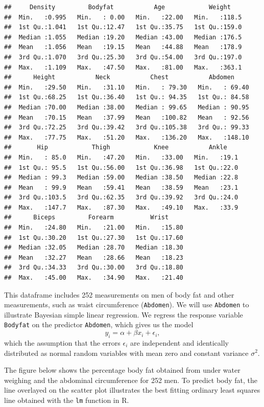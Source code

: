 \documentclass[]{book}
\theoremstyle{definition}
\theoremstyle{definition}
\theoremstyle{definition}
\theoremstyle{remark}
\begin{document}
\begin{verbatim}
##     Density         Bodyfat           Age            Weight     
##  Min.   :0.995   Min.   : 0.00   Min.   :22.00   Min.   :118.5  
##  1st Qu.:1.041   1st Qu.:12.47   1st Qu.:35.75   1st Qu.:159.0  
##  Median :1.055   Median :19.20   Median :43.00   Median :176.5  
##  Mean   :1.056   Mean   :19.15   Mean   :44.88   Mean   :178.9  
##  3rd Qu.:1.070   3rd Qu.:25.30   3rd Qu.:54.00   3rd Qu.:197.0  
##  Max.   :1.109   Max.   :47.50   Max.   :81.00   Max.   :363.1  
##      Height           Neck           Chest           Abdomen      
##  Min.   :29.50   Min.   :31.10   Min.   : 79.30   Min.   : 69.40  
##  1st Qu.:68.25   1st Qu.:36.40   1st Qu.: 94.35   1st Qu.: 84.58  
##  Median :70.00   Median :38.00   Median : 99.65   Median : 90.95  
##  Mean   :70.15   Mean   :37.99   Mean   :100.82   Mean   : 92.56  
##  3rd Qu.:72.25   3rd Qu.:39.42   3rd Qu.:105.38   3rd Qu.: 99.33  
##  Max.   :77.75   Max.   :51.20   Max.   :136.20   Max.   :148.10  
##       Hip            Thigh            Knee           Ankle     
##  Min.   : 85.0   Min.   :47.20   Min.   :33.00   Min.   :19.1  
##  1st Qu.: 95.5   1st Qu.:56.00   1st Qu.:36.98   1st Qu.:22.0  
##  Median : 99.3   Median :59.00   Median :38.50   Median :22.8  
##  Mean   : 99.9   Mean   :59.41   Mean   :38.59   Mean   :23.1  
##  3rd Qu.:103.5   3rd Qu.:62.35   3rd Qu.:39.92   3rd Qu.:24.0  
##  Max.   :147.7   Max.   :87.30   Max.   :49.10   Max.   :33.9  
##      Biceps         Forearm          Wrist      
##  Min.   :24.80   Min.   :21.00   Min.   :15.80  
##  1st Qu.:30.20   1st Qu.:27.30   1st Qu.:17.60  
##  Median :32.05   Median :28.70   Median :18.30  
##  Mean   :32.27   Mean   :28.66   Mean   :18.23  
##  3rd Qu.:34.33   3rd Qu.:30.00   3rd Qu.:18.80  
##  Max.   :45.00   Max.   :34.90   Max.   :21.40
\end{verbatim}

This dataframe includes 252 measurements on men of body fat and other
measurements, such as waist circumference (\texttt{Abdomen}). We will
use \texttt{Abdomen} to illustrate Bayesian simple linear regression. We
regress the response variable \texttt{Bodyfat} on the predictor
\texttt{Abdomen}, which gives us the model
\[ y_i = \alpha + \beta x_i + \epsilon_i, \] which the assumption that
the errors \(\epsilon_i\) are independent and identically distributed as
normal random variables with mean zero and constant variance
\(\sigma^2\).

The figure below shows the percentage body fat obtained from under water
weighing and the abdominal circumference for 252 men. To predict body
fat, the line overlayed on the scatter plot illustrates the best fitting
ordinary least squares line obtained with the \texttt{lm} function in R.
\end{document}
